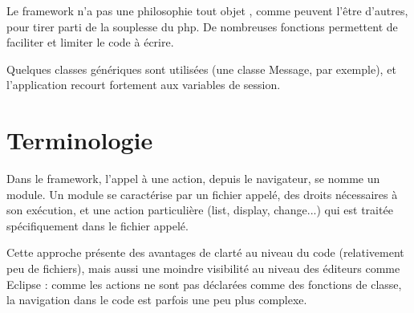 Le framework n'a pas une philosophie \og tout objet \fg{}, comme peuvent l'être d'autres, pour tirer parti de la souplesse du php. De nombreuses fonctions permettent de faciliter et limiter le code à écrire.

Quelques classes génériques sont utilisées (une classe Message, par exemple), et l'application recourt fortement aux variables de session. 

\section*{Terminologie}

Dans le framework, l'appel à une action, depuis le navigateur, se nomme un module. Un module se caractérise par un fichier appelé, des droits nécessaires à son exécution, et une action particulière (list, display, change...) qui est traitée spécifiquement dans le fichier appelé.

Cette approche présente des avantages de clarté au niveau du code (relativement peu de fichiers), mais aussi une moindre visibilité au niveau des éditeurs comme Eclipse : comme les actions ne sont pas déclarées comme des fonctions de classe, la navigation dans le code est parfois une peu plus complexe.
